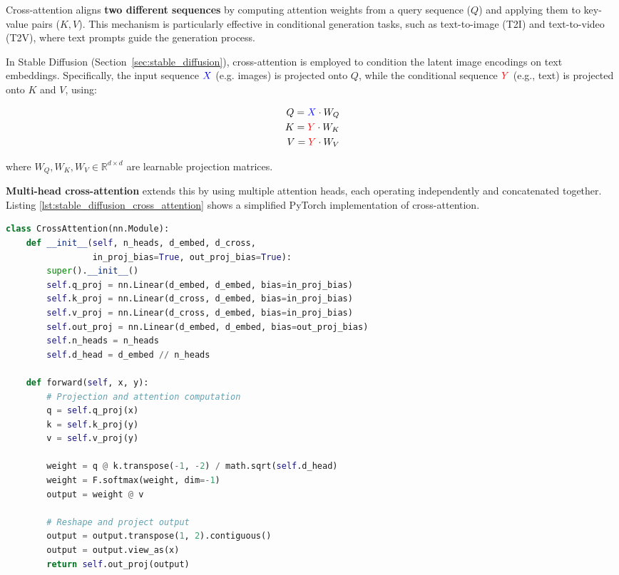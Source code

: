 Cross-attention aligns \textbf{two different sequences} by computing attention weights from a query sequence ($Q$) and applying them to key-value pairs ($K, V$). This mechanism is particularly effective in conditional generation tasks, such as text-to-image (T2I) and text-to-video (T2V), where text prompts guide the generation process.

In Stable Diffusion (Section~\ref{sec:stable_diffusion}), cross-attention is employed to condition the latent image encodings on text embeddings. Specifically, the input sequence $\textcolor{blue}{X}$ (e.g. images) is projected onto $Q$, while the conditional sequence $\textcolor{red}{Y}$ (e.g., text) is projected onto $K$ and $V$, using:

\begin{align*}
    Q = \textcolor{blue}{X}\cdot W_Q \\
    K = \textcolor{red}{Y}\cdot W_K \\
    V = \textcolor{red}{Y}\cdot W_V
\end{align*}

where $W_Q, W_K, W_V \in \mathbb{R}^{d \times d}$ are learnable projection matrices.

\textbf{Multi-head cross-attention} extends this by using multiple attention heads, each operating independently and concatenated together. Listing \ref{lst:stable_diffusion_cross_attention} shows a simplified PyTorch implementation of cross-attention.

\begin{lstlisting}[language=Python, caption={PyTorch implementation of cross-attention. The '@' operator represents the dot product.}, label={lst:stable_diffusion_cross_attention}]
class CrossAttention(nn.Module):
    def __init__(self, n_heads, d_embed, d_cross, 
                 in_proj_bias=True, out_proj_bias=True):
        super().__init__()
        self.q_proj = nn.Linear(d_embed, d_embed, bias=in_proj_bias)
        self.k_proj = nn.Linear(d_cross, d_embed, bias=in_proj_bias)
        self.v_proj = nn.Linear(d_cross, d_embed, bias=in_proj_bias)
        self.out_proj = nn.Linear(d_embed, d_embed, bias=out_proj_bias)
        self.n_heads = n_heads
        self.d_head = d_embed // n_heads

    def forward(self, x, y):
        # Projection and attention computation
        q = self.q_proj(x)
        k = self.k_proj(y)
        v = self.v_proj(y)
        
        weight = q @ k.transpose(-1, -2) / math.sqrt(self.d_head)
        weight = F.softmax(weight, dim=-1)
        output = weight @ v

        # Reshape and project output
        output = output.transpose(1, 2).contiguous()
        output = output.view_as(x)
        return self.out_proj(output)
\end{lstlisting}

